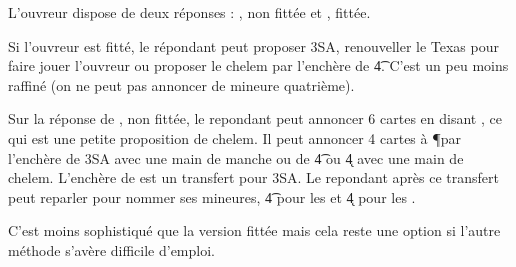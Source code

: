 \documentclass[a4paper,12pt]{article}
\begin{document}
L'ouvreur dispose de deux réponses : , non fittée et , fittée.

Si l'ouvreur est fitté, le répondant peut proposer 3SA, renouveller le Texas pour faire jouer l'ouvreur ou proposer le chelem par l'enchère de \t4. C'est un peu moins raffiné (on ne peut pas annoncer de mineure quatrième).

Sur la réponse de , non fittée, le repondant peut annoncer 6 cartes en disant , ce qui est une petite proposition de chelem. Il peut annoncer 4 cartes à \P par l'enchère de 3SA avec une main de manche ou de \t4 ou \k4 avec une main de chelem.
L'enchère de  est un transfert pour 3SA. Le repondant après ce transfert peut reparler pour nommer ses mineures, \t4 pour les \K et \k4 pour les \T.

C'est moins sophistiqué que la version fittée mais cela reste une option si l'autre méthode s'avère difficile d'emploi. 
\end{document}
